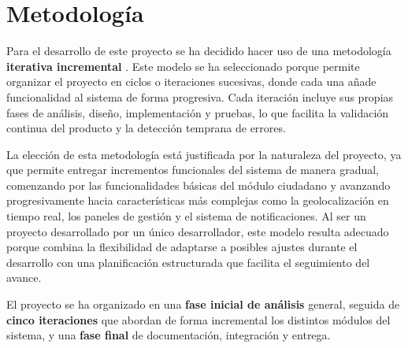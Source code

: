 \section{Metodología}\label{cap:metodología}

Para el desarrollo de este proyecto se ha decidido hacer uso de una metodología \textbf{iterativa incremental} \cite{sommerville2015}. Este modelo se ha seleccionado porque permite organizar el proyecto en ciclos o iteraciones sucesivas, donde cada una añade funcionalidad al sistema de forma progresiva. Cada iteración incluye sus propias fases de análisis, diseño, implementación y pruebas, lo que facilita la validación continua del producto y la detección temprana de errores.

La elección de esta metodología está justificada por la naturaleza del proyecto, ya que permite entregar incrementos funcionales del sistema de manera gradual, comenzando por las funcionalidades básicas del módulo ciudadano y avanzando progresivamente hacia características más complejas como la geolocalización en tiempo real, los paneles de gestión y el sistema de notificaciones. Al ser un proyecto desarrollado por un único desarrollador, este modelo resulta adecuado porque combina la flexibilidad de adaptarse a posibles ajustes durante el desarrollo con una planificación estructurada que facilita el seguimiento del avance.

El proyecto se ha organizado en una \textbf{fase inicial de análisis} general, seguida de \textbf{cinco iteraciones} que abordan de forma incremental los distintos módulos del sistema, y una \textbf{fase final} de documentación, integración y entrega.